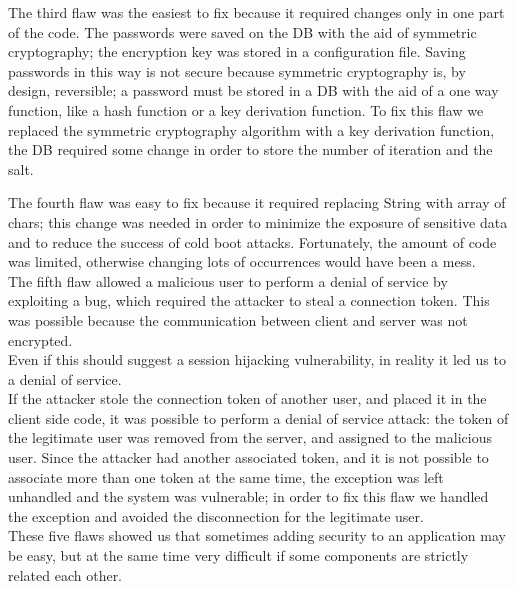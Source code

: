 The third flaw was the easiest to fix because it required changes only in one part of the code.\newline
The passwords were saved on the DB with the aid of symmetric cryptography; the encryption key was stored in a configuration file.\newline
Saving passwords in this way is not secure because symmetric cryptography is, by design, reversible; a password must be stored in a DB with the aid of a one way function, like a hash function or a key derivation function.\newline
To fix this flaw we replaced the symmetric cryptography algorithm with a key derivation function, the DB required some change in order to store the number of iteration and the salt.\newline

The fourth flaw was easy to fix because it required replacing String with array of chars; this change was needed in order to minimize the exposure of sensitive data and to reduce the success of cold boot attacks.\newline
Fortunately, the amount of code was limited, otherwise changing lots of occurrences would have been a mess.\\

The fifth flaw allowed a malicious user to perform a denial of service by exploiting a bug, which required the attacker to steal a connection
token. This was possible because the communication between client and server was not encrypted.\\
Even if this should suggest a session hijacking vulnerability, in reality it led us to a denial of service.\\
If the attacker stole the connection token of another user, and placed it in the client side code, it was possible
to perform a denial of service attack: the token of the legitimate user was removed from the server, and assigned to the malicious user.
Since the attacker had another associated token, and it is not possible to associate more than one token at the same time, the exception was left unhandled and the system was vulnerable; in order to fix this flaw we handled the exception and avoided the disconnection for the legitimate user.\\

These five flaws showed us that sometimes adding security to an application may be easy, but at the same time very difficult if some components are strictly related each other.\\


